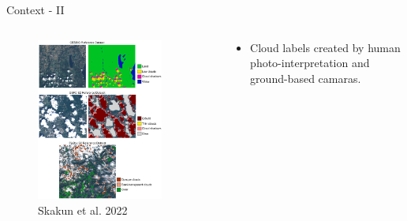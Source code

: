\begin{frame}{Context - II}
	\begin{columns}
		\begin{column}{0.5\textwidth}
			\begin{figure}
				\includegraphics[width=0.85\textwidth]{images/contex_I.png}
				\caption[fig:introfig01]{Skakun et al. 2022}				
				\label{fig:introfig02}
			\end{figure}	
		\end{column}
		\begin{column}{0.5\textwidth}
			\begin{itemize}
				\item Cloud labels created by human photo-interpretation and ground-based camaras.
			\end{itemize}
		\end{column}
	\end{columns}
\end{frame}


